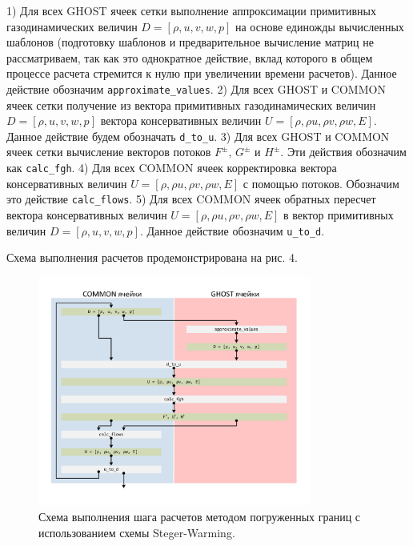 1)	Для всех GHOST ячеек сетки выполнение аппроксимации примитивных газодинамических величин $D = [\rho, u, v, w, p]$ на основе единожды вычисленных шаблонов (подготовку шаблонов и предварительное вычисление матриц не рассматриваем, так как это однократное действие, вклад которого в общем процессе расчета стремится к нулю при увеличении времени расчетов).
Данное действие обозначим \texttt{approximate\_values}.
2)	Для всех GHOST и COMMON ячеек сетки получение из вектора примитивных газодинамических величин $D = [\rho, u, v, w, p]$ вектора консервативных величин $U = [\rho, \rho u, \rho v, \rho w, E]$.
Данное действие будем обозначать \texttt{d\_to\_u}.
3)	Для всех GHOST и COMMON ячеек сетки вычисление векторов потоков $F^{\pm}$, $G^{\pm}$ и $H^{\pm}$.
Эти действия обозначим как \texttt{calc\_fgh}.
4)	Для всех COMMON ячеек корректировка вектора консервативных величин $U = [\rho, \rho u, \rho v, \rho w, E]$ с помощью потоков.
Обозначим это действие \texttt{calc\_flows}.
5)	Для всех COMMON ячеек обратных пересчет вектора консервативных величин $U = [\rho, \rho u, \rho v, \rho w, E]$ в вектор примитивных величин $D = [\rho, u, v, w, p]$.
Данное действие обозначим \texttt{u\_to\_d}.

Схема выполнения расчетов продемонстрирована на рис. 4.

\begin{figure}[ht]
	\centering
	\includegraphics[width=0.8\textwidth]{./pics/text_4_ibm/immersed_boundary_method_scheme.pdf}
	\caption{Схема выполнения шага расчетов методом погруженных границ с использованием схемы Steger-Warming.}
	\label{fig:text_4_ibm_immersed_boundary_method_cheme}
\end{figure}

